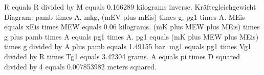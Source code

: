 R equals R divided by M equals 0.166289 kilograms inverse.  
Kräftegleichgewicht  
Diagram: pamb times A, mkg, (mEV plus mEis) times g, pg1 times A.  
MEis equals xEis times MEW equals 0.06 kilograms.  
(mK plus MEW plus MEis) times g plus pamb times A equals pg1 times A.  
pg1 equals (mK plus MEW plus MEis) times g divided by A plus pamb equals 1.49155 bar.  
mg1 equals pg1 times Vg1 divided by R times Tg1 equals 3.42304 grams.  
A equals pi times D squared divided by 4 equals 0.007853982 meters squared.